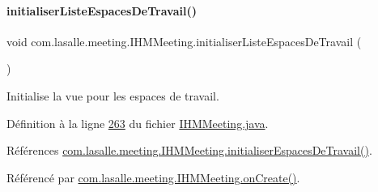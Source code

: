 \paragraph{\texorpdfstring{initialiser\+Liste\+Espaces\+De\+Travail()}{initialiserListeEspacesDeTravail()}}
{\footnotesize\ttfamily void com.\+lasalle.\+meeting.\+I\+H\+M\+Meeting.\+initialiser\+Liste\+Espaces\+De\+Travail (\begin{DoxyParamCaption}{ }\end{DoxyParamCaption})\hspace{0.3cm}{\ttfamily [private]}}



Initialise la vue pour les espaces de travail. 



Définition à la ligne \hyperlink{_i_h_m_meeting_8java_source_l00263}{263} du fichier \hyperlink{_i_h_m_meeting_8java_source}{I\+H\+M\+Meeting.\+java}.



Références \hyperlink{_i_h_m_meeting_8java_source_l00171}{com.\+lasalle.\+meeting.\+I\+H\+M\+Meeting.\+initialiser\+Espaces\+De\+Travail()}.



Référencé par \hyperlink{_i_h_m_meeting_8java_source_l00060}{com.\+lasalle.\+meeting.\+I\+H\+M\+Meeting.\+on\+Create()}.


